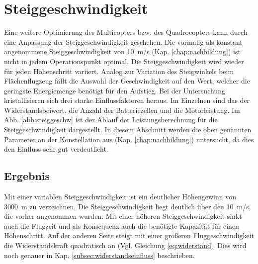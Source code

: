 
\newpage
\section{Steiggeschwindigkeit}
\label{sec:steiggeschwindigkeit}
Eine weitere Optimierung des Multicopters bzw. des Quadrocopters kann durch eine Anpassung der Steiggeschwindigkeit geschehen. Die vormalig als konstant angenommene Steiggeschwindigkeit von \SI{10}{m/s} (Kap. \ref{chap:nachbildung}) ist nicht in jedem Operationspunkt optimal. Die Steiggeschwindigkeit wird wieder für jeden Höhenschritt variiert. Analog zur Variation des Steigwinkels beim Flächenflugzeug fällt die Auswahl der Geschwindigkeit auf den Wert, welcher die geringste Energiemenge benötigt für den Aufstieg. Bei der Untersuchung kristallisieren sich drei starke Einflussfaktoren heraus. Im Einzelnen sind das der Widerstandsbeiwert, die Anzahl der Batteriezellen und die Motorleistung. Im Abb. \ref{abb:steiggeschw} ist der Ablauf der Leistungsberechnung für die Steiggeschwindigkeit dargestellt. In diesem Abschnitt werden die oben genannten Parameter an der Konstellation aus (Kap. \ref{chap:nachbildung}) untersucht, da dies den Einfluss sehr gut verdeutlicht.


\subsection{Ergebnis}
Mit einer variablen Steiggeschwindigkeit ist ein deutlicher Höhengewinn von \SI{3000}{m} zu verzeichnen. Die Steiggeschwindigkeit liegt deutlich über den \SI{10}{m/s}, die vorher angenommen wurden. Mit einer höheren Steiggeschwindigkeit sinkt auch die Flugzeit und als Konsequenz auch die benötigte Kapazität für einen Höhenschritt. Auf der anderen Seite steigt mit einer größeren Fluggeschwindigkeit die Widerstandskraft quadratisch an (Vgl. Gleichung \ref{eq:widerstand}. Dies wird noch genauer in Kap. \ref{subsec:widerstandseinfluss} beschrieben. 

